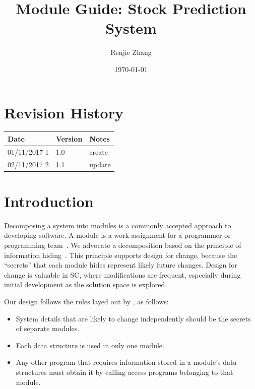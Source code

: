 \documentclass[12pt, titlepage]{article}
\begin{document}
\title{Module Guide: Stock Prediction System} 
\author{Renjie Zhang}
\date{\today}

\maketitle


\section{Revision History}

\begin{tabularx}{\textwidth}{p{3cm}p{2cm}X}
\toprule {\bf Date} & {\bf Version} & {\bf Notes}\\
\midrule
01/11/2017 1 & 1.0 & create\\
02/11/2017 2 & 1.1 & update\\
\bottomrule
\end{tabularx}

\newpage

\tableofcontents

\listoftables

\listoffigures

\newpage


\section{Introduction}

Decomposing a system into modules is a commonly accepted approach to developing
software. A module is a work assignment for a programmer or programming
team~\citep{ParnasEtAl1984}. We advocate a decomposition
based on the principle of information hiding~\citep{Parnas1972a}. This
principle supports design for change, because the ``secrets'' that each module
hides represent likely future changes. Design for change is valuable in SC,
where modifications are frequent, especially during initial development as the
solution space is explored. 

Our design follows the rules layed out by \citet{ParnasEtAl1984}, as follows:
\begin{itemize}
\item System details that are likely to change independently should be the
secrets of separate modules.
\item Each data structure is used in only one module.
\item Any other program that requires information stored in a module's data
structures must obtain it by calling access programs belonging to that module.
\end{itemize}
\end{document}
